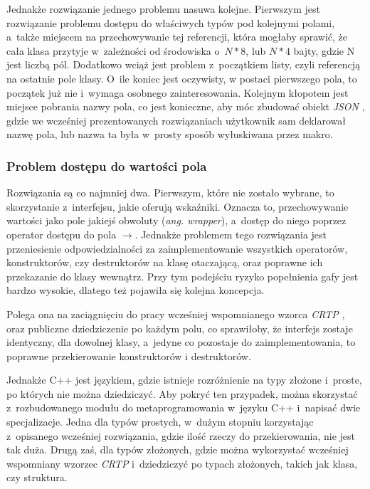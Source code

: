 \documentclass[12pt]{article}
\newcommand{\n}{\newline}
\newcommand{\nonpl}[1]{{\it #1}}
\newcommand{\ang}[1]{\nonpl{ang. #1}}
\newcommand{\JSON}{\nonpl{JSON} }
\newcommand{\CRTP}{\nonpl{CRTP} }
\begin{document}
{{			Jednakże rozwiązanie jednego problemu nasuwa kolejne. Pierwszym jest rozwiązanie problemu dostępu do właściwych typów pod kolejnymi polami, a~także
			miejscem na przechowywanie tej referencji, która mogłaby sprawić, że cała klasa przytyje w~zależności od środowiska o~$N * 8$, lub $N * 4$ bajty,
			gdzie N jest liczbą pól. Dodatkowo wciąż jest problem z~początkiem listy, czyli referencją na ostatnie pole klasy. O~ile koniec jest oczywisty,
			w postaci pierwszego pola, to początek już nie i~wymaga osobnego zainteresowania. Kolejnym kłopotem jest miejsce pobrania nazwy pola, co jest
			konieczne, aby móc zbudować obiekt \JSON, gdzie we wcześniej prezentowanych rozwiązaniach użytkownik sam deklarował nazwę pola, lub nazwa ta
			była w~prosty sposób wyłuskiwana przez makro.\n

			{
				\subsubsection{Problem dostępu do wartości pola}

				Rozwiązania są co najmniej dwa. Pierwszym, które nie zostało wybrane, to skorzystanie z~interfejsu, jakie oferują wskaźniki. Oznacza to,
				przechowywanie wartości jako pole jakiejś obwoluty (\ang{wrapper}), a~dostęp do niego poprzez operator dostępu do pola $\rightarrow$. Jednakże problemem
				tego rozwiązania jest przeniesienie odpowiedzialności za zaimplementowanie wszystkich operatorów, konstruktorów, czy destruktorów
				na klasę otaczającą, oraz poprawne ich przekazanie do klasy wewnątrz. Przy tym podejściu ryzyko popełnienia gafy jest bardzo wysokie, dlatego też
				pojawiła się kolejna koncepcja.\n

				Polega ona na zaciągnięciu do pracy wcześniej wspomnianego wzorca \CRTP, oraz publiczne dziedziczenie po każdym polu, co sprawiłoby, że
				interfejs zostaje identyczny, dla dowolnej klasy, a~jedyne co pozostaje do zaimplementowania, to poprawne przekierowanie konstruktorów
				i destruktorów.\n

				Jednakże C++ jest językiem, gdzie istnieje rozróżnienie na typy złożone i~proste, po których nie można dziedziczyć. Aby pokryć ten przypadek,
				można skorzystać z~rozbudowanego modułu do metaprogramowania w~języku C++ i~napisać dwie specjalizacje. Jedna dla typów prostych, w~dużym stopniu
				korzystając z~opisanego wcześniej rozwiązania, gdzie ilość rzeczy do przekierowania, nie jest tak duża. Drugą zaś, dla typów złożonych,
				gdzie można wykorzystać wcześniej wspomniany wzorzec \CRTP i~dziedziczyć po typach złożonych, takich jak klasa, czy struktura.\n

}}}
\end{document}
